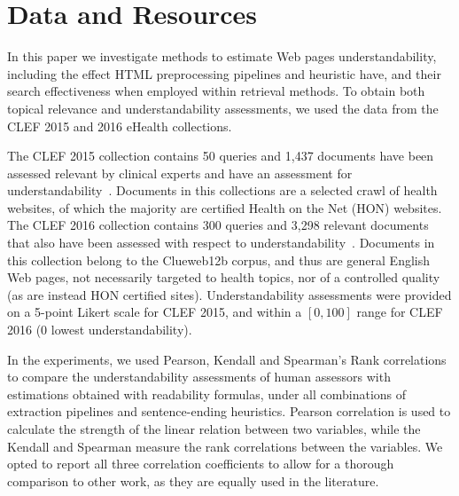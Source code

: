 \section{Data and Resources}

In this paper we investigate methods to estimate Web pages understandability, including the effect HTML preprocessing pipelines and heuristic have, and their search effectiveness when employed within retrieval methods. To obtain both topical relevance and  understandability assessments, we used the data from the CLEF 2015 and 2016 eHealth collections. 

The CLEF 2015 collection contains 50 queries and 1,437 documents have been assessed relevant by clinical experts and have an assessment for understandability~\cite{clef15}. Documents in this collections are a selected crawl of health websites, of which the majority are certified Health on the Net (HON) websites.
The CLEF 2016 collection contains 300 queries and 3,298 relevant documents that also have been assessed with respect to understandability~\cite{clef16}. Documents in this collection belong to the Clueweb12b corpus, and thus are general English Web pages, not necessarily targeted to health topics, nor of a controlled quality (as are instead HON certified sites). 
Understandability assessments were provided on a 5-point Likert scale for CLEF 2015, and within a $[0,100]$ range for CLEF 2016 (0 lowest understandability). 


In the experiments, we used Pearson, Kendall and Spearman's Rank correlations to compare the understandability assessments of human assessors with estimations obtained with readability formulas, under all combinations of extraction pipelines and sentence-ending heuristics. Pearson correlation is used to calculate the strength of the linear relation between two variables, while the Kendall and Spearman measure the rank correlations between the variables. We opted to report all three correlation coefficients to allow for a thorough comparison to other work, as they are equally used in the literature. 

